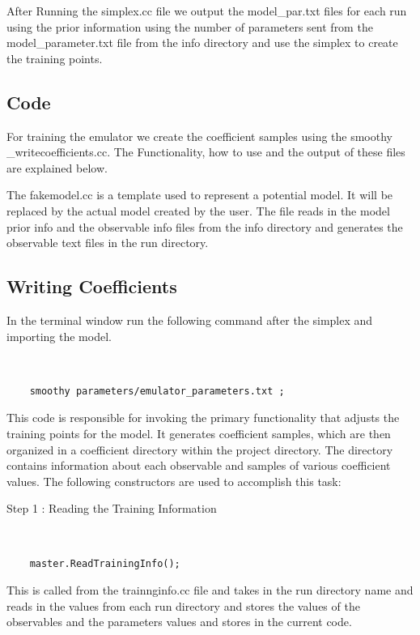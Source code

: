 \documentclass[12pt]{article}
\numberwithin{equation}{section}
\numberwithin{figure}{section}
\begin{document}
After Running the simplex.cc file we output the model\_par.txt files for each run using the prior information using the number of parameters sent from the model\_parameter.txt file from the info directory and use the simplex to create the training points.

\subsection{Code}

For training the emulator we create the coefficient samples using the smoothy
\_writecoefficients.cc. The Functionality, how to use and the output of these files are explained below.

The fakemodel.cc is a template used to represent a potential model. It will be replaced by the actual model created by the user. The file reads in the model prior info and the observable info files from the info directory and generates the observable text files in the run directory. 
 
\subsection{Writing Coefficients}


In the terminal window run the following command after the simplex and importing the model.

{\tt 
\begin{verbatim}
    smoothy parameters/emulator_parameters.txt ; 
\end{verbatim}
}

This code is responsible for invoking the primary functionality that adjusts the training points for the model. It generates coefficient samples, which are then organized in a coefficient directory within the project directory. The directory contains information about each observable and samples of various coefficient values. The following constructors are used to accomplish this task:

\begin{description}
\item[Step 1 : Reading the Training Information]
\end{description}

{\tt 
\begin{verbatim}
    master.ReadTrainingInfo(); 
\end{verbatim}
}

This is called from the trainnginfo.cc file and takes in the run directory name and reads in the values from each run directory and stores the values of the observables and the parameters values and stores in the current code. 
\end{document}
